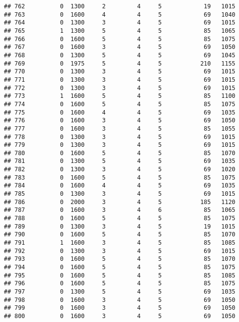 \documentclass[]{article}
\begin{document}
\begin{verbatim}
## 762          0  1300     2         4     5            19   1015
## 763          0  1600     4         4     5            69   1040
## 764          0  1300     3         4     5            69   1015
## 765          1  1300     5         4     5            85   1065
## 766          0  1600     5         4     5            85   1075
## 767          0  1600     3         4     5            69   1050
## 768          0  1300     5         4     5            69   1045
## 769          0  1975     5         4     5           210   1155
## 770          0  1300     3         4     5            69   1015
## 771          0  1300     3         4     5            69   1015
## 772          0  1300     3         4     5            69   1015
## 773          1  1600     5         4     5            85   1100
## 774          0  1600     5         4     5            85   1075
## 775          0  1600     4         4     5            69   1035
## 776          0  1600     3         4     5            69   1050
## 777          0  1600     3         4     5            85   1055
## 778          0  1300     3         4     5            69   1015
## 779          0  1300     3         4     5            69   1015
## 780          0  1600     5         4     5            85   1070
## 781          0  1300     5         4     5            69   1035
## 782          0  1300     3         4     5            69   1020
## 783          0  1600     5         4     5            85   1075
## 784          0  1600     4         4     5            69   1035
## 785          0  1300     3         4     5            69   1015
## 786          0  2000     3         4     5           185   1120
## 787          0  1600     3         4     6            85   1065
## 788          0  1600     5         4     5            85   1075
## 789          0  1300     3         4     5            19   1015
## 790          0  1600     5         4     5            85   1070
## 791          1  1600     3         4     5            85   1085
## 792          0  1300     3         4     5            69   1015
## 793          0  1600     5         4     5            85   1070
## 794          0  1600     5         4     5            85   1075
## 795          0  1600     5         4     5            85   1085
## 796          0  1600     5         4     5            85   1075
## 797          0  1300     5         4     5            69   1035
## 798          0  1600     3         4     5            69   1050
## 799          0  1600     3         4     5            69   1050
## 800          0  1600     3         4     5            69   1050

\end{verbatim}
\end{document}
